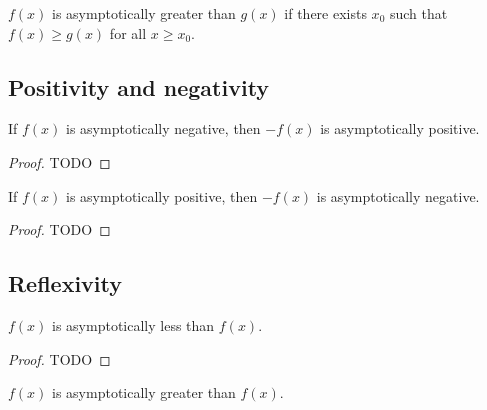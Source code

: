 \begin{definition}
    \label{def:asymp_ge}
    \leanok
    $f(x)$ is asymptotically greater than $g(x)$ if there exists $x_0$ such that
    $f(x) \ge g(x)$ for all $x \ge x_0$.

\end{definition}


\subsection{Positivity and negativity}

\begin{lemma}
    \label{lemma:asymp_neg_of_pos}
    \leanok
    If $f(x)$ is asymptotically negative, then $-f(x)$ is asymptotically positive.
\end{lemma}

\begin{proof}
    \leanok
    TODO
\end{proof}

\begin{lemma}
    \label{lemma:asymp_pos_of_neg}
    \leanok
    If $f(x)$ is asymptotically positive, then $-f(x)$ is asymptotically negative.
\end{lemma}

\begin{proof}
    \leanok
    TODO
\end{proof}


\subsection{Reflexivity}

\begin{lemma}
    \label{lemma:asymp_le_refl}
    \leanok
    $f(x)$ is asymptotically less than $f(x)$.
\end{lemma}

\begin{proof}
    \leanok
    TODO
\end{proof}

\begin{lemma}
    \label{lemma:asymp_ge_refl}
    \leanok
    $f(x)$ is asymptotically greater than $f(x)$.
\end{lemma}

